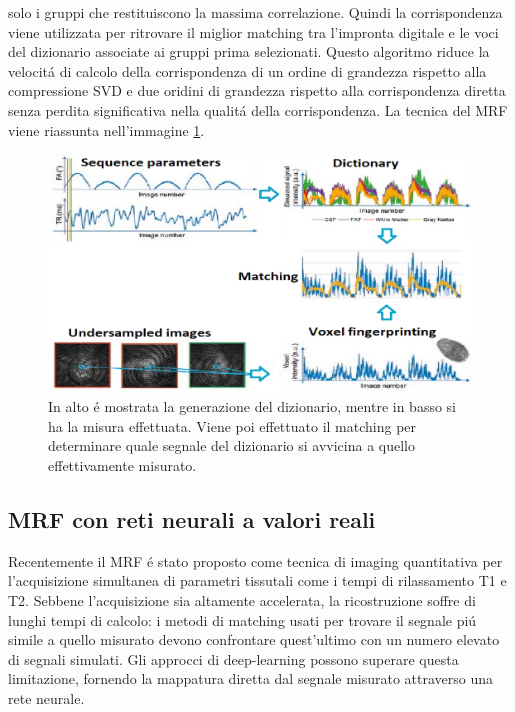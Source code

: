 \documentclass[a4paper,10pt]{article}
\begin{document}
solo i gruppi che restituiscono la massima correlazione. Quindi la corrispondenza viene utilizzata per ritrovare il miglior matching tra l'impronta digitale e le voci del dizionario associate ai gruppi prima selezionati. Questo algoritmo riduce la velocit\'a di calcolo della corrispondenza di un ordine di grandezza rispetto alla compressione SVD e due oridini di grandezza rispetto alla corrispondenza diretta senza perdita significativa nella qualit\'a della corrispondenza. 
 La tecnica del MRF viene riassunta nell'immagine \ref{MRFpng}.
 
 \begin{figure}[h!]
  \centering
  \includegraphics[scale=0.3]{MRF.png}
  \caption{In alto \'e mostrata la generazione del dizionario, mentre in basso si ha la misura effettuata. Viene poi effettuato il matching per determinare quale segnale del dizionario si avvicina a quello effettivamente misurato.}
  \label{MRFpng}
 \end{figure}

 \subsection{MRF con reti neurali a valori reali}
 
 Recentemente il MRF \'e stato proposto come tecnica di imaging quantitativa per l'acquisizione simultanea di parametri tissutali come i tempi di rilassamento T1 e T2. Sebbene l'acquisizione sia altamente accelerata, la ricostruzione soffre di lunghi tempi di calcolo: i metodi di matching usati per trovare il segnale pi\'u simile a quello misurato devono confrontare quest'ultimo con un numero elevato di segnali simulati. Gli approcci di deep-learning possono superare questa limitazione, fornendo la mappatura diretta dal segnale misurato attraverso una rete neurale. 
 
\end{document}
